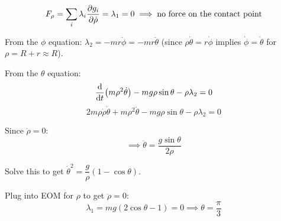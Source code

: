 \[
    F_\rho = \sum_i\lambda_i\pdv{g_i}{\dot{\rho}} = \lambda_1 = 0
    \implies \text{no force on the contact point}
\]

From the $\phi$ equation: $\lambda_2 = -mr\ddot{\phi} = -mr\ddot{\theta}$ (since $\rho\dot{\theta} = r\dot{\phi}$ implies $\dot{\phi} = \dot{\theta}$ for $\rho = R+r \approx R$).

From the $\theta$ equation:
\[
    \dv{t}(m\rho^2\dot{\theta}) - mg\rho\sin\theta - \rho\lambda_2 = 0
\]
\[
    2m\rho\dot{\rho}\dot{\theta} + m\rho^2\ddot{\theta} - mg\rho\sin\theta - \rho\lambda_2 = 0
\]

Since $\dot{\rho} = 0$:
\[
    \implies \boxed{\ddot{\theta} = \frac{g\sin\theta}{2\rho}}
\]

Solve this to get $\dot{\theta}^2 = \dfrac{g}{\rho}(1 - \cos\theta)$.

Plug into EOM for $\rho$ to get $\ddot{\rho} = 0$:
\[
    \lambda_1 = mg(2\cos\theta - 1) = 0 \implies \boxed{\theta = \frac{\pi}{3}}
\]
